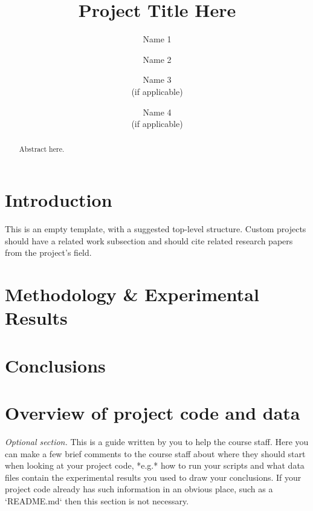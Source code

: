 \documentclass[10pt,twocolumn,letterpaper]{article}
\begin{document}
\title{Project Title Here}
\author{Name 1 \and Name 2 \and Name 3\\(if applicable) \and Name 4\\(if applicable)}
\maketitle

\begin{abstract}
   Abstract here.
\end{abstract}

\section{Introduction}

This is an empty template, with a suggested top-level structure.
Custom projects should have a related work subsection and should
cite related research papers from the project's field.

\section{Methodology \& Experimental Results}



\section{Conclusions}



\appendix


\section{Overview of project code and data}

{\em Optional section.} This is a guide written by you to help the course staff.
Here you can make a few brief comments to the course staff about where
they should start when looking at your project code, *e.g.* how to run your scripts and what
data files contain the experimental results you used to draw your conclusions.
If your project code already has such information in an obvious place, such as a `README.md`
then this section is not necessary.
\end{document}
